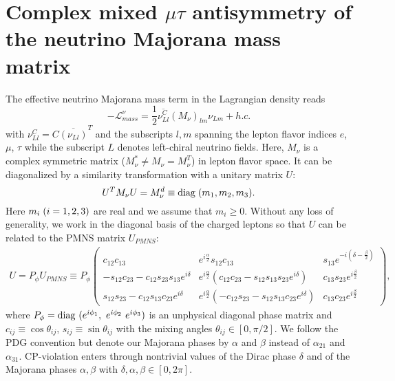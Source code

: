 \documentclass[11pt]{article}
\def\bea{\begin{eqnarray}}
\def\eea{\end{eqnarray}}
\begin{document}
\section{Complex mixed $\mu\tau$ antisymmetry of the neutrino Majorana mass matrix}\label{sec2} The effective neutrino Majorana mass term in the Lagrangian density reads
\begin{equation} -\mathcal{L}_{mass}^\nu= \frac{1}{2}\overline{\nu_{Ll}^C} (M_\nu)_{lm}\nu_{Lm} + h.c. \label{lag}
\end{equation}  with $\nu_{Ll}^C=C\overline{(\nu_{Ll})}^T$ and the subscripts $l,m$ spanning the lepton flavor indices $e$, $\mu$, $\tau$ while the subscript $L$ denotes left-chiral neutrino fields. Here, $M_\nu$ is a complex symmetric matrix ($M_\nu^*\neq M_{\nu}=M_\nu^T$) in lepton flavor space. It can be diagonalized by a similarity transformation with a unitary matrix $U$:
\begin{equation} U^T M_\nu U=M_\nu^d \equiv {\rm diag}\hspace{1mm}(m_1,m_2,m_3).\label{e0} \end{equation} Here ${m}_i\hspace{1mm}(i=1,2,3)$ are real and we assume that $m_i\geq 0$. Without any loss of generality, we work in the diagonal basis of the charged leptons so that $U$ can be related to the PMNS matrix $U_{PMNS}$:  
\bea
U=P_\phi U_{PMNS}\equiv 
P_\phi \begin{pmatrix}
c_{1 2}c_{1 3} & e^{i\frac{\alpha}{2}} s_{1 2}c_{1 3} & s_{1 3}e^{-i(\delta - \frac{\beta}{2})}\\
-s_{1 2}c_{2 3}-c_{1 2}s_{2 3}s_{1 3} e^{i\delta }& e^{i\frac{\alpha}{2}} (c_{1 2}c_{2 3}-s_{1 2}s_{1 3} s_{2 3} e^{i\delta}) & c_{1 3}s_{2 3}e^{i\frac{\beta}{2}} \\
s_{1 2}s_{2 3}-c_{1 2}s_{1 3}c_{2 3}e^{i\delta} & e^{i\frac{\alpha}{2}} (-c_{1 2}s_{2 3}-s_{1 2}s_{1 3}c_{2 3}e^{i\delta}) & c_{1 3}c_{2 3}e^{i\frac{\beta}{2}}
\end{pmatrix},~\label{eu}
\eea
where $P_\phi={\rm diag}~(e^{i\phi_1},~e^{i\phi_2}~e^{i\phi_3})$ is an unphysical diagonal  phase matrix and  $c_{ij}\equiv\cos\theta_{ij}$, $s_{ij}\equiv\sin\theta_{ij}$ with the mixing angles $\theta_{ij}\in[0,\pi/2]$. We follow the PDG convention\cite{Tanabashi:2018oca} but denote our Majorana phases by $\alpha$ and $\beta$ instead of $\alpha_{21}$ and $\alpha_{31}$. CP-violation enters through nontrivial values of the Dirac phase $\delta$ and of the Majorana phases $\alpha,\beta$  with $\delta,\alpha,\beta\in[0,2\pi]$.\\
\end{document}
